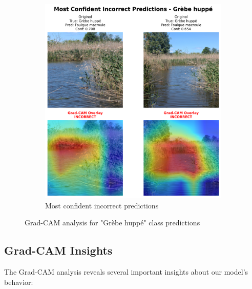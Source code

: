 \documentclass[12pt,a4paper]{article}
\begin{document}
\begin{figure}[H]
\begin{subfigure}[b]{0.45\textwidth}
        \includegraphics[width=\textwidth]{../../output/gradcam_best_model_analysis_20250615_172003/class_analysis/Grèbe_huppé_incorrect.png}
        \caption{Most confident incorrect predictions}
        \label{fig:grebe_incorrect}
    \end{subfigure}
    \caption{Grad-CAM analysis for "Grèbe huppé" class predictions}
    \label{fig:grebe_gradcam}
\end{figure}

\subsection{Grad-CAM Insights}

The Grad-CAM analysis reveals several important insights about our model's behavior:
\end{document}
